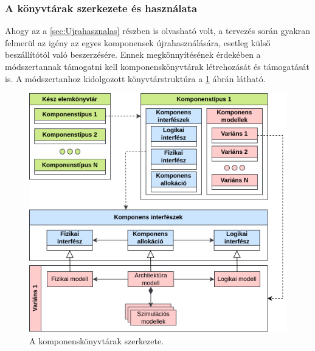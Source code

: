         \subsubsection{A könyvtárak szerkezete és használata}
        Ahogy az a \ref{sec:Ujrahasznalas} részben is olvasható volt, a tervezés során gyakran felmerül az igény az egyes komponensek újrahasználására, esetleg külső beszállítótól való beszerzésére.
        Ennek megkönnyítésének érdekében a módszertannak támogatni kell komponenskönyvtárak létrehozását és támogatását is.
        A módszertanhoz kidolgozott könyvtárstruktúra a \ref{fig:Konyvtar} ábrán látható.
        \begin{figure}[!ht]
            \centering
            \includegraphics[width=150mm, keepaspectratio]{figures/InterfaceParts.drawio.png}
            \caption{A komponenskönyvtárak szerkezete.} 
            \label{fig:Konyvtar}
        \end{figure}

